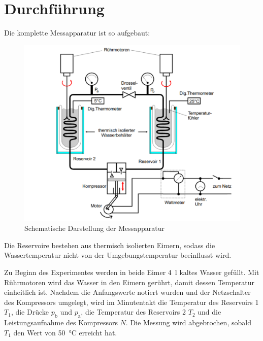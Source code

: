 \section{Durchführung}
\label{sec:Durchführung}
Die komplette Messapparatur ist so aufgebaut:
\begin{figure}
\centering
\includegraphics[width=\textwidth]{Darstellung_Waermepumpe.pdf}
\caption{Schematische Darstellung der Messapparatur \cite[4]{anleitung}}
\end{figure}
Die Reservoire bestehen aus thermisch isolierten Eimern, sodass die Wassertemperatur nicht von der Umgebungstemperatur beeinflusst wird.

Zu Beginn des Experimentes werden in beide Eimer \SI{4}{\litre} kaltes Wasser gefüllt. 
Mit Rührmotoren wird das Wasser in den Eimern gerührt, damit dessen Temperatur einheitlich ist.
Nachdem die Anfangswerte notiert wurden und der Netzschalter des Kompressors umgelegt, wird im Minutentakt die Temperatur des Reservoirs 1 $T_{1}$, die Drücke $p_{\text{b}}$ und $p_{\text{a}}$, die Temperatur des Reservoirs 2 $T_{2}$ und die Leistungsaufnahme des Kompressors $N$.
Die Messung wird abgebrochen, sobald $T_1$ den Wert von \SI{50}{\celsius} erreicht hat.

